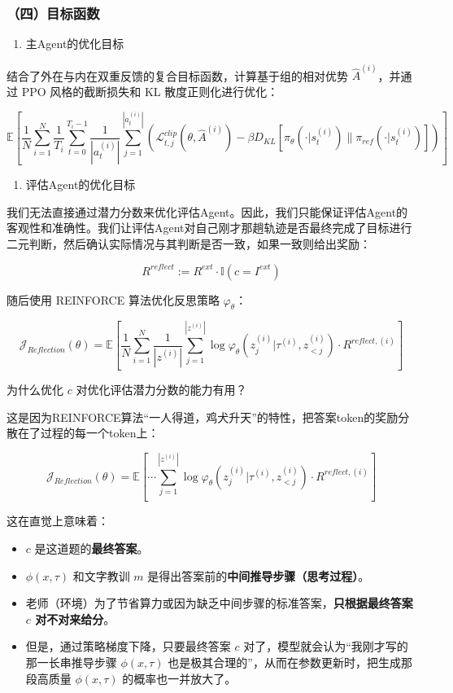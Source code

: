 \hypertarget{ux56dbux76eeux6807ux51fdux6570}{%
\subsubsection{（四）目标函数}\label{ux56dbux76eeux6807ux51fdux6570}}

\begin{enumerate}
\def\labelenumi{\arabic{enumi}.}
\tightlist
\item
  主Agent的优化目标
\end{enumerate}

结合了外在与内在双重反馈的复合目标函数，计算基于组的相对优势 \(\hat{A}^{(i)}\)，并通过 PPO 风格的截断损失和 KL 散度正则化进行优化：

\[
\mathbb{E}\left[
\frac{1}{N}\sum_{i=1}^{N}
\frac{1}{T_i}\sum_{t=0}^{T_i-1}
\frac{1}{|a_t^{(i)}|}\sum_{j=1}^{|a_t^{(i)}|}
\left(
\mathcal{L}_{t,j}^{clip}(\theta,\hat{A}^{(i)})
-\beta D_{KL}\left[\pi_\theta(\cdot|s_t^{(i)})\|\pi_{ref}(\cdot|s_t^{(i)})\right]
\right)
\right]
\]

\begin{enumerate}
\def\labelenumi{\arabic{enumi}.}
\setcounter{enumi}{1}
\tightlist
\item
  评估Agent的优化目标
\end{enumerate}

我们无法直接通过潜力分数来优化评估Agent。因此，我们只能保证评估Agent的客观性和准确性。我们让评估Agent对自己刚才那趟轨迹是否最终完成了目标进行二元判断，然后确认实际情况与其判断是否一致，如果一致则给出奖励：

\[
R^{reflect} := R^{ext}\cdot \mathbb{I}(c=I^{ext})
\]

随后使用 REINFORCE 算法优化反思策略 \(\varphi_\theta\)：

\[
\mathcal{J}_{Reflection}(\theta)
= \mathbb{E}\left[
\frac{1}{N}\sum_{i=1}^{N}
\frac{1}{|z^{(i)}|}
\sum_{j=1}^{|z^{(i)}|}
\log \varphi_\theta(z_j^{(i)}|\tau^{(i)},z_{<j}^{(i)})
\cdot R^{reflect,(i)}
\right]
\]

为什么优化 \(c\) 对优化评估潜力分数的能力有用？

这是因为REINFORCE算法``一人得道，鸡犬升天''的特性，把答案token的奖励分散在了过程的每一个token上：

\[
\mathcal{J}_{Reflection}(\theta)
= \mathbb{E}\left[
\cdots
\sum_{j=1}^{|z^{(i)}|}
\log \varphi_\theta(z_j^{(i)}|\tau^{(i)},z_{<j}^{(i)})
\cdot R^{reflect,(i)}
\right]
\]

这在直觉上意味着：

\begin{itemize}
\tightlist
\item
  \(c\) 是这道题的\textbf{最终答案}。
\item
  \(\phi(x,\tau)\) 和文字教训 \(m\) 是得出答案前的\textbf{中间推导步骤（思考过程）}。
\item
  老师（环境）为了节省算力或因为缺乏中间步骤的标准答案，\textbf{只根据最终答案 \(c\) 对不对来给分}。
\item
  但是，通过策略梯度下降，只要最终答案 \(c\) 对了，模型就会认为``我刚才写的那一长串推导步骤 \(\phi(x,\tau)\) 也是极其合理的''，从而在参数更新时，把生成那段高质量 \(\phi(x,\tau)\) 的概率也一并放大了。
\end{itemize}

